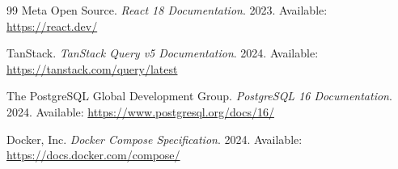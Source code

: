\documentclass[12pt,a4paper]{report}
\begin{document}
\begin{thebibliography}{99}
Meta Open Source. \textit{React 18 Documentation}. 2023. Available:
\url{https://react.dev/}

TanStack. \textit{TanStack Query v5 Documentation}. 2024. Available:
\url{https://tanstack.com/query/latest}

The PostgreSQL Global Development Group. \textit{PostgreSQL 16
Documentation}. 2024. Available:
\url{https://www.postgresql.org/docs/16/}

Docker, Inc. \textit{Docker Compose Specification}. 2024. Available:
\url{https://docs.docker.com/compose/}

\end{thebibliography}
\end{document}
